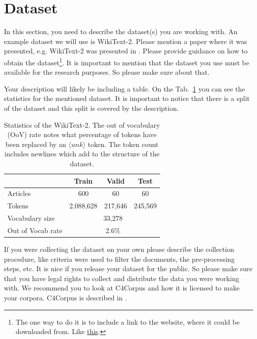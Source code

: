 \documentclass{article}
\begin{document}
\section{Dataset}
In this section, you need to describe the dataset(s) you are working with. 
An example dataset we will use is WikiText-2. Please mention a paper where it was presented, e.g. WikiText-2 was presented in \cite{merity2017pointer}. Please provide guidance on how to obtain the dataset\footnote{The one way to do it is to include a link to the website, where it could be downloaded from. Like \href{https://blog.einstein.ai/the-wikitext-long-term-dependency-language-modeling-dataset/}{this}.}. It is important to mention that the dataset you use must be available for the research purposes. So please make sure about that.

Your description will likely be including a table. On the Tab.~\ref{tab:statistics} you can see the statistics for the mentioned dataset. It is important to notice that there is a split of the dataset and this split is covered by the description.

\begin{table}[tbh!]
\begin{center}
\begin{tabular}[t]{|l|ccc|}
\hline
 & Train & Valid & Test \\
\hline
Articles & 600 & 60 & 60  \\
Tokens& 2,088,628 & 217,646 & 245,569 \\
Vocabulary size & \multicolumn{3}{c|}{33,278} \\
Out of Vocab rate &  \multicolumn{3}{c|}{2.6\%}  \\
\hline
\end{tabular}
\caption{Statistics of the WikiText-2. The out of vocabulary (OoV) rate notes what percentage of tokens have been replaced by an $\langle unk \rangle$ token. The token count includes newlines which add to the structure of the dataset.}
\label{tab:statistics}
\end{center}
\end{table}

If you were collecting the dataset on your own please describe the collection procedure, like criteria were used to filter the documents, the pre-processing steps, etc. It is nice if you release your dataset for the public. So please make sure that you have legal rights to collect and distribute the data you were working with. We recommend you to look at C4Corpus and how it is licensed to make your corpora. C4Corpus is described in \cite{habernal2016c4corpus}.
\end{document}

